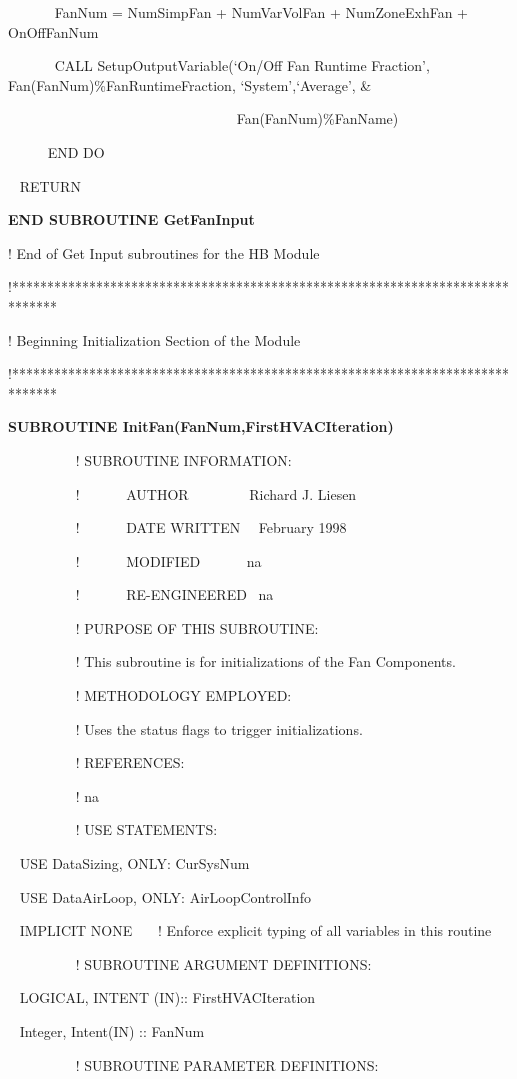 ~~~~~~ FanNum = NumSimpFan + NumVarVolFan + NumZoneExhFan + OnOffFanNum

~~~~~~ CALL SetupOutputVariable(`On/Off Fan Runtime Fraction', Fan(FanNum)\%FanRuntimeFraction, `System',`Average', \&

~~~~~~~~~~~~~~~~~~~~~~~~~~~~~~~~ Fan(FanNum)\%FanName)

~~~~~ END DO

~ RETURN

\textbf{END SUBROUTINE GetFanInput}

! End of Get Input subroutines for the HB Module

!******************************************************************************

! Beginning Initialization Section of the Module

!******************************************************************************

\textbf{SUBROUTINE InitFan(FanNum,FirstHVACIteration)}

~~~~~~~~~ ! SUBROUTINE INFORMATION:

~~~~~~~~~ !~~~~~~ AUTHOR~~~~~~~~ Richard J. Liesen

~~~~~~~~~ !~~~~~~ DATE WRITTEN~~ February 1998

~~~~~~~~~ !~~~~~~ MODIFIED~~~~~~ na

~~~~~~~~~ !~~~~~~ RE-ENGINEERED~ na

~~~~~~~~~ ! PURPOSE OF THIS SUBROUTINE:

~~~~~~~~~ ! This subroutine is for initializations of the Fan Components.

~~~~~~~~~ ! METHODOLOGY EMPLOYED:

~~~~~~~~~ ! Uses the status flags to trigger initializations.

~~~~~~~~~ ! REFERENCES:

~~~~~~~~~ ! na

~~~~~~~~~ ! USE STATEMENTS:

~ USE DataSizing, ONLY: CurSysNum

~ USE DataAirLoop, ONLY: AirLoopControlInfo

~ IMPLICIT NONE~~~ ! Enforce explicit typing of all variables in this routine

~~~~~~~~~ ! SUBROUTINE ARGUMENT DEFINITIONS:

~ LOGICAL, INTENT (IN):: FirstHVACIteration

~ Integer, Intent(IN) :: FanNum

~~~~~~~~~ ! SUBROUTINE PARAMETER DEFINITIONS:

